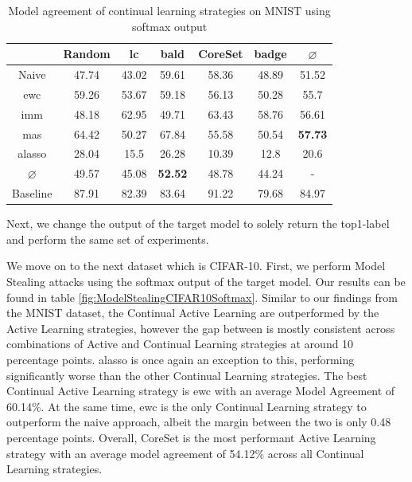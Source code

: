\begin{table}[h]
    \centering
    \begin{tabular}{ c | c c c c c | c } 
         & Random & \gls{lc} & \gls{bald} & CoreSet & \gls{badge} & $\varnothing$\\ 
        \hline
        Naive & 47.74 & 43.02 & 59.61 & 58.36 & 48.89 & 51.52\\
        \gls{ewc} &  59.26 & 53.67 & 59.18 & 56.13 & 50.28 & 55.7\\
        \gls{imm} & 48.18 & 62.95 & 49.71 & 63.43 & 58.76 & 56.61 \\
        \gls{mas} &  64.42 & 50.27 & 67.84 & 55.58 & 50.54 & \textbf{57.73}\\
        \gls{alasso} & 28.04 & 15.5 & 26.28 & 10.39 & 12.8 & 20.6\\
        \hline
        $\varnothing$ & 49.57 & 45.08 & \textbf{52.52} & 48.78 & 44.24 & -\\
        Baseline & 87.91 & 82.39 & 83.64 & 91.22 & 79.68 & 84.97\\
    \end{tabular}
    \caption{Model agreement of continual learning strategies on MNIST using softmax output}
    \label{fig:ModelStealingMNISTSoftmax}
\end{table}

Next, we change the output of the target model to solely return the top1-label and perform the same set of experiments. 



We move on to the next dataset which is CIFAR-10. First, we perform Model Stealing attacks using the softmax output of the target model. Our results can be found in
table \ref{fig:ModelStealingCIFAR10Softmax}. Similar to our findings from the MNIST dataset, the Continual Active Learning are outperformed by the Active Learning
strategies, however the gap between is mostly consistent across combinations of Active and Continual Learning strategies at around 10 percentage points. \gls{alasso}
is once again an exception to this, performing significantly worse than the other Continual Learning strategies. The best Continual Active Learning strategy is \gls{ewc}
with an average Model Agreement of 60.14\%. At the same time, \gls{ewc} is the only Continual Learning strategy to outperform the naive approach, albeit the margin
between the two is only 0.48 percentage points. Overall, CoreSet is the most performant Active Learning strategy with an average model agreement of 54.12\% across all
Continual Learning strategies. \par

